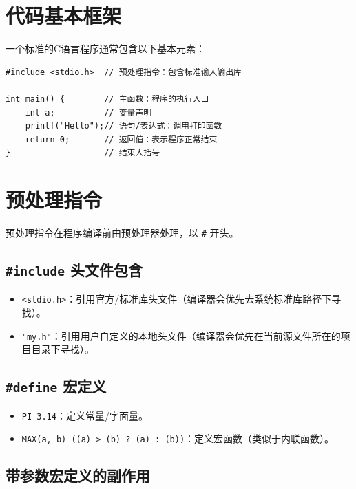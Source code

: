 \section{代码基本框架}

一个标准的C语言程序通常包含以下基本元素：

\begin{lstlisting}[caption={标准C语言程序框架}]
#include <stdio.h>  // 预处理指令：包含标准输入输出库

int main() {        // 主函数：程序的执行入口
    int a;          // 变量声明
    printf("Hello");// 语句/表达式：调用打印函数
    return 0;       // 返回值：表示程序正常结束
}                   // 结束大括号
\end{lstlisting}

\newpage

\section{预处理指令}

预处理指令在程序编译前由预处理器处理，以 \texttt{\#} 开头。

\subsection{\texorpdfstring{\texttt{\#include} 头文件包含}{\#include 头文件包含}}

\begin{itemize}
    \item \texttt{<stdio.h>}：引用官方/标准库头文件（编译器会优先去系统标准库路径下寻找）。
    \item \texttt{"my.h"}：引用用户自定义的本地头文件（编译器会优先在当前源文件所在的项目目录下寻找）。
\end{itemize}

\subsection{\texorpdfstring{\texttt{\#define} 宏定义}{\#define 宏定义}}

\begin{itemize}
    \item \texttt{PI 3.14}：定义常量/字面量。
    \item \texttt{MAX(a, b) ((a) > (b) ? (a) : (b))}：定义宏函数（类似于内联函数）。
\end{itemize}

\subsection{带参数宏定义的副作用}

